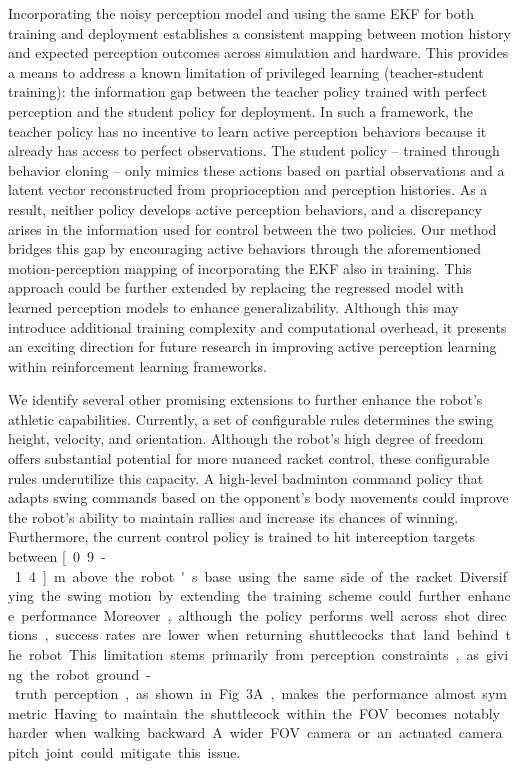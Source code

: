 \documentclass[9pt,twocolumn,twoside]{osajnl}
\begin{document}
Incorporating the noisy perception model and using the same \ac{EKF} for both training and deployment establishes a consistent mapping between motion history and expected perception outcomes across simulation and hardware. This provides a means to address a known limitation of privileged learning (teacher-student training): the information gap between the teacher policy trained with perfect perception and the student policy for deployment. In such a framework, the teacher policy has no incentive to learn active perception behaviors because it already has access to perfect observations. The student policy -- trained through behavior cloning -- only mimics these actions based on partial observations and a latent vector reconstructed from proprioception and perception histories. As a result, neither policy develops active perception behaviors, and a discrepancy arises in the information used for control between the two policies. Our method bridges this gap by encouraging active behaviors through the aforementioned motion-perception mapping of incorporating the \ac{EKF} also in training. This approach could be further extended by replacing the regressed model with learned perception models to enhance generalizability. Although this may introduce additional training complexity and computational overhead, it presents an exciting direction for future research in improving active perception learning within reinforcement learning frameworks.

We identify several other promising extensions to further enhance the robot's athletic capabilities. Currently, a set of configurable rules determines the swing height, velocity, and orientation. Although the robot's high degree of freedom offers substantial potential for more nuanced racket control, these configurable rules underutilize this capacity. A high-level badminton command policy that adapts swing commands based on the opponent's body movements could improve the robot's ability to maintain rallies and increase its chances of winning. Furthermore, the current control policy is trained to hit interception targets between \unit[0.9-1.4]{m} above the robot's base using the same side of the racket. Diversifying the swing motion by extending the training scheme could further enhance performance. Moreover, although the policy performs well across shot directions, success rates are lower when returning shuttlecocks that land behind the robot. This limitation stems primarily from perception constraints, as giving the robot ground-truth perception, as shown in Fig. 3A, makes the performance almost symmetric. Having to maintain the shuttlecock within the \ac{FOV} becomes notably harder when walking backward. A wider \ac{FOV} camera or an actuated camera pitch joint could mitigate this issue.
\end{document}
